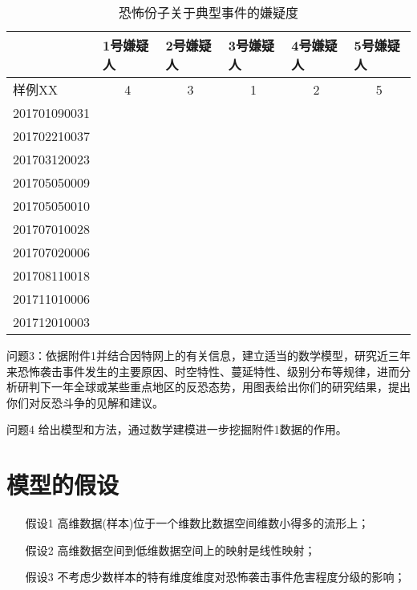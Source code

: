 \documentclass[bwprint]{gmcmthesis}
\begin{document}
\begin{table}[hbp]
	\centering
	\caption{恐怖份子关于典型事件的嫌疑度}
	\begin{tabular}{|l|l|l|l|l|l|}
		\hline
		\multicolumn{1}{|p{4em}|}{ } & \multicolumn{1}{p{4.7em}|}{1号嫌疑人} & \multicolumn{1}{p{4.7em}|}{2号嫌疑人} & \multicolumn{1}{p{4.7em}|}{3号嫌疑人} & \multicolumn{1}{p{4.7em}|}{4号嫌疑人} & \multicolumn{1}{p{4.7em}|}{5号嫌疑人} \\
		\hline
		\multicolumn{1}{|p{4em}|}{样例XX} & \multicolumn{1}{c|}{4} & \multicolumn{1}{c|}{3} & \multicolumn{1}{c|}{1} & \multicolumn{1}{c|}{2} & \multicolumn{1}{c|}{5} \\
		\hline
		201701090031 &       &       &       &       &  \\
		\hline
		201702210037 &       &       &       &       &  \\
		\hline
		201703120023 &       &       &       &       &  \\
		\hline
		201705050009 &       &       &       &       &  \\
		\hline
		201705050010 &       &       &       &       &  \\
		\hline
		201707010028 &       &       &       &       &  \\
		\hline
		201707020006 &       &       &       &       &  \\
		\hline
		201708110018 &       &       &       &       &  \\
		\hline
		201711010006 &       &       &       &       &  \\
		\hline
		201712010003 &       &       &       &       &  \\
		\hline
	\end{tabular}%
	\label{tab:addlabel}%
\end{table}%

问题3：依据附件1并结合因特网上的有关信息，建立适当的数学模型，研究近三年来恐怖袭击事件发生的主要原因、时空特性、蔓延特性、级别分布等规律，进而分析研判下一年全球或某些重点地区的反恐态势，用图表给出你们的研究结果，提出你们对反恐斗争的见解和建议。

问题4 给出模型和方法，通过数学建模进一步挖掘附件1数据的作用。
\newpage

\section{模型的假设}

\begin{itemize}
\item[假设1] 高维数据(样本)位于一个维数比数据空间维数小得多的流形上；
\item[假设2] 高维数据空间到低维数据空间上的映射是线性映射；
\item[假设3] 不考虑少数样本的特有维度维度对恐怖袭击事件危害程度分级的影响；

\end{itemize}
\newpage
\end{document}
